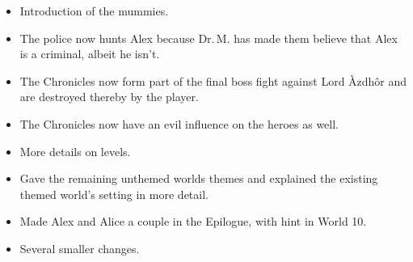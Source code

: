 \documentclass{gd-document}
\newcommand\DrM{Dr.\,M.\xspace}
\newcommand\Azdhor{Lord Àzdhôr\xspace}
\begin{document}
\begin{itemize}
    \begin{itemize}
    \item Introduction of the mummies.
    \item The police now hunts Alex because \DrM has made them believe
      that Alex is a criminal, albeit he isn’t.
    \item The Chronicles now form part of the final boss fight against
      \Azdhor and are destroyed thereby by the player.
    \item The Chronicles now have an evil influence on the heroes as
      well.
    \item More details on levels.
    \item Gave the remaining unthemed worlds themes and explained the
      existing themed world’s setting in more detail.
    \item Made Alex and Alice a couple in the Epilogue, with hint in
      World 10.
    \item Several smaller changes.
    \end{itemize}
\end{itemize}
\end{document}
